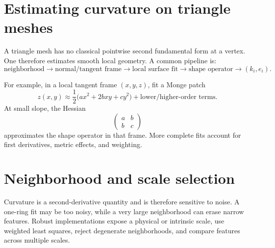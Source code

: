 \section{Estimating curvature on triangle meshes}

A triangle mesh has no classical pointwise second fundamental form at a vertex.
One therefore estimates smooth local geometry.  A common pipeline is:
\[
\text{neighborhood}
\to
\text{normal/tangent frame}
\to
\text{local surface fit}
\to
\text{shape operator}
\to
(k_i,e_i).
\]

For example, in a local tangent frame \((x,y,z)\), fit a Monge patch
\[
z(x,y)
\approx
\frac12\bigl(ax^2+2bxy+cy^2\bigr)
+
\text{lower/higher-order terms}.
\]
At small slope, the Hessian
\[
\begin{pmatrix}a&b\\b&c\end{pmatrix}
\]
approximates the shape operator in that frame.  More complete fits account for
first derivatives, metric effects, and weighting.

\section{Neighborhood and scale selection}

Curvature is a second-derivative quantity and is therefore sensitive to noise.
A one-ring fit may be too noisy, while a very large neighborhood can erase
narrow features.  Robust implementations expose a physical or intrinsic scale,
use weighted least squares, reject degenerate neighborhoods, and compare
features across multiple scales.

